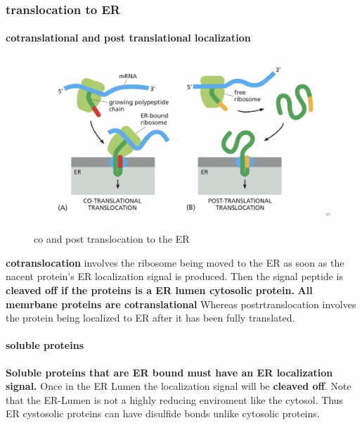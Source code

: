 \documentclass[../main.tex]{subfiles}
\begin{document}
\subsubsection{translocation to ER}

\paragraph{cotranslational and post translational localization}
\begin{figure}[H]
    \centering
    \includegraphics[width=0.7\linewidth]{CoTranslation.png}
    \caption{co and post translocation to the ER}
    \label{fig:enter-label}
\end{figure}

\textbf{\gls{cotranslocation}} involves the ribosome being moved to the ER as soon as the nacent protein's ER localization signal is produced. Then the signal peptide is\textbf{ cleaved off if the proteins is a ER lumen cytosolic protein.} \textbf{All memrbane proteins are cotranslational} Whereas \gls{postrtranslocation} involves the protein being localized to ER after it has been fully translated.


\paragraph{soluble proteins}

\textbf{Soluble proteins that are ER bound must have an ER localization signal.} Once in the ER Lumen the localization signal will be \textbf{cleaved off}. Note that the ER-Lumen is not a highly reducing enviroment like the cytosol. Thus ER cystosolic proteins can have disulfide bonds unlike cytosolic proteins.
\end{document}
